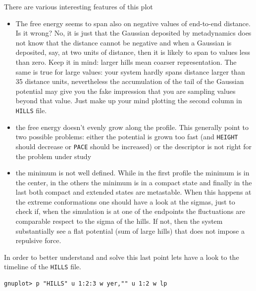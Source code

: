 \documentclass[10pt,fleqn,a4paper]{report}
\begin{document}
There are various interesting features of this plot
\begin{itemize}
\item The free energy seems to span also on negative values of end-to-end distance. Is it wrong? No, it is just that the Gaussian deposited by metadynamics does not know that the distance cannot be negative and when a Gaussian is deposited, say, at two units of distance, then it is likely to span to values less than zero. Keep it in mind: larger hills mean coarser representation.
The same is true for large values: your system hardly spans distance larger than 35 distance units, nevertheless the accumulation  of the tail of the  Gaussian potential may give you the fake impression that you are sampling values beyond that value. Just make up your mind plotting the second column in \texttt{HILLS} file.
\item the free energy doesn't evenly grow along the profile. This generally point to two possible problems: either the potential is grown too fast (and \texttt{HEIGHT} should decrease or \texttt{PACE} should be increased) or the descriptor is not right for the problem under study
\item the minimum is not well defined. While in the first profile the minimum is in the center, in the others the minimum is in a compact state and finally in the last both compact and extended states are metastable. When this happens at the extreme conformations one should have a look at the sigmas, just to check if, when the simulation is at one of the endpoints the fluctuations are comparable respect to the sigma of the hills. If not, then the system substantially see a flat potential (sum of large hills) that does not impose a repulsive force.
\end{itemize}

In order to better understand and solve this last point lets have a look to the timeline of the 
\texttt{HILLS} file.

\begin{verbatim}
gnuplot> p "HILLS" u 1:2:3 w yer,"" u 1:2 w lp
\end{verbatim}
\end{document}

